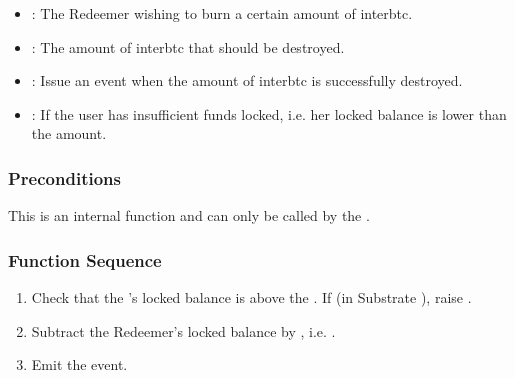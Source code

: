 \documentclass[a4paper,10pt,english]{sphinxmanual}
\begin{document}

\begin{itemize}
\item {} 
: The Redeemer wishing to burn a certain amount of interbtc.

\item {} 
: The amount of interbtc that should be destroyed.

\end{itemize}

\begin{itemize}
\item {} 
: Issue an event when the amount of interbtc is successfully destroyed.

\end{itemize}

\begin{itemize}
\item {} 
: If the user has insufficient funds locked, i.e. her locked balance is lower than the amount.

\end{itemize}



\subsubsection{Preconditions}
\label{\detokenize{spec/treasury:id10}}
This is an internal function and can only be called by the {\hyperref[\detokenize{spec/redeem:redeem-protocol}]{}}.


\subsubsection{Function Sequence}
\label{\detokenize{spec/treasury:id11}}\begin{enumerate}
%
\item {} 
Check that the ’s locked balance is above the . If  (in Substrate ), raise .

\item {} 
Subtract the Redeemer’s locked balance by , i.e. .

\item {} 
Emit the  event.

\end{enumerate}
\end{document}
